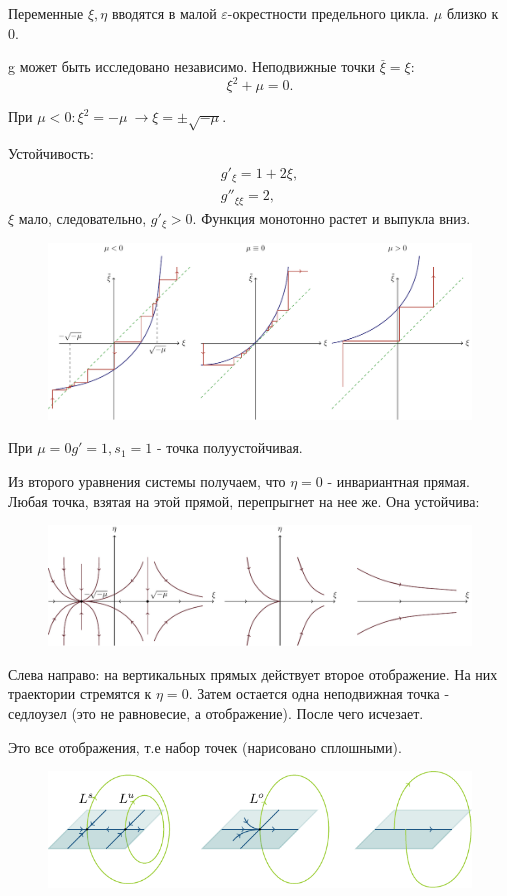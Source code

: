 Переменные $\xi, \eta$ вводятся в малой $\varepsilon$-окрестности предельного цикла. $\mu$ близко к 0.

g может быть исследовано независимо. Неподвижные точки $\stackrel{\_}{\xi}=\xi$:
$$\xi^2+\mu=0.$$

При $\mu<0: \xi^2=-\mu~\rightarrow \xi=\pm \sqrt{-\mu}$.

Устойчивость:
\begin{gather*}
	g'_{\xi}=1+2\xi, \\
	g''_{\xi \xi}=2,
\end{gather*}
$\xi$ мало, следовательно, $g'_{\xi}>0$. Функция монотонно растет и выпукла вниз.
\begin{figure}[H]
	\centering
	\includegraphics[width=1\linewidth]{fig/fig64.pdf}   
\end{figure}

При $\mu=0 g'=1, s_1=1$ - точка полуустойчивая. 

Из второго уравнения системы получаем, что $\eta=0$ - инвариантная прямая. Любая точка, взятая на этой прямой, перепрыгнет на нее же. Она устойчива:  
\begin{figure}[H]
	\centering
	\includegraphics[width=1\linewidth]{fig/fig65.pdf}   
\end{figure}

Слева направо: на вертикальных прямых действует второе отображение. На них траектории стремятся к $\eta=0$. Затем остается одна неподвижная точка - седлоузел (это не равновесие, а отображение). После чего исчезает.

Это все отображения, т.е набор точек (нарисовано сплошными).
\begin{figure}[H]
	\centering
	\includegraphics[width=1\linewidth]{fig/fig66.pdf}   
\end{figure}

